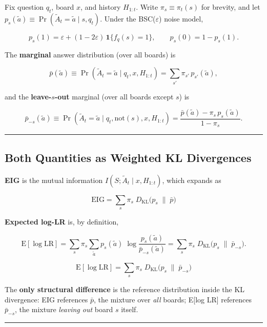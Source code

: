 \documentclass[
]{article}
\begin{document}
Fix question \(q_t\), board \(x\), and history \(H_{1:t}\). Write
\(\pi_s \equiv \pi_t(s)\) for brevity, and let
\(p_s(\tilde{a}) \equiv \Pr(\tilde{A}_t = \tilde{a} \mid s, q_t)\).
Under the BSC(\(\varepsilon\)) noise model,

\[p_s(1) = \varepsilon + (1-2\varepsilon)\,\mathbf{1}\{f_q(s)=1\}, \qquad p_s(0) = 1 - p_s(1).\]

The \textbf{marginal} answer distribution (over all boards) is

\[\bar{p}(\tilde{a}) \equiv \Pr(\tilde{A}_t = \tilde{a} \mid q_t, x, H_{1:t}) = \sum_{s'} \pi_{s'}\, p_{s'}(\tilde{a}),\]

and the \textbf{leave-\(s\)-out} marginal (over all boards except \(s\))
is

\[\bar{p}_{-s}(\tilde{a}) \equiv \Pr(\tilde{A}_t = \tilde{a} \mid q_t, \text{not}(s), x, H_{1:t}) = \frac{\bar{p}(\tilde{a}) - \pi_s\, p_s(\tilde{a})}{1 - \pi_s}.\]

\begin{center}\rule{0.5\linewidth}{0.5pt}\end{center}

\subsection{Both Quantities as Weighted KL
Divergences}\label{both-quantities-as-weighted-kl-divergences}

\textbf{EIG} is the mutual information
\(I(S;\tilde{A}_t \mid x, H_{1:t})\), which expands as

\[\boxed{\mathrm{EIG} = \sum_s \pi_s\; D_{\mathrm{KL}}\!\bigl(p_s \;\|\; \bar{p}\bigr)}\]

\textbf{Expected log-LR} is, by definition,

\[\mathrm{E}[\log \mathrm{LR}] = \sum_s \pi_s \sum_{\tilde{a}} p_s(\tilde{a})\;\log\frac{p_s(\tilde{a})}{\bar{p}_{-s}(\tilde{a})} = \sum_s \pi_s\; D_{\mathrm{KL}}\!\bigl(p_s \;\|\; \bar{p}_{-s}\bigr).\]

\[\boxed{\mathrm{E}[\log \mathrm{LR}] = \sum_s \pi_s\; D_{\mathrm{KL}}\!\bigl(p_s \;\|\; \bar{p}_{-s}\bigr)}\]

The \textbf{only structural difference} is the reference distribution
inside the KL divergence: EIG references \(\bar{p}\), the mixture over
\emph{all} boards; E{[}log LR{]} references \(\bar{p}_{-s}\), the
mixture \emph{leaving out} board \(s\) itself.

\begin{center}\rule{0.5\linewidth}{0.5pt}\end{center}
\end{document}
